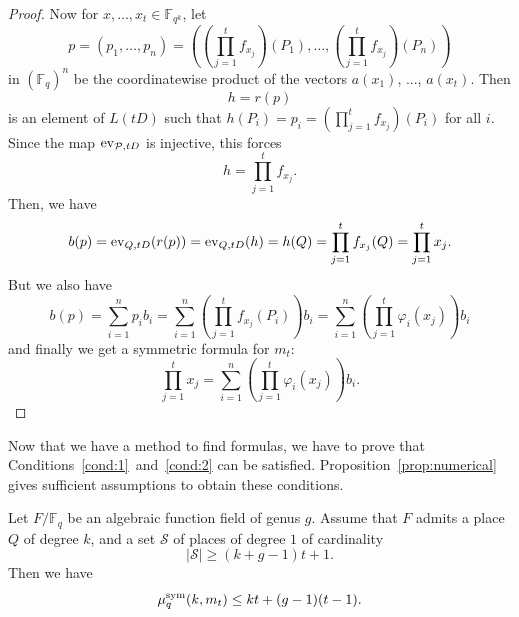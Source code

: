 \begin{proof}
Now for $x,\dots,x_t\in\mathbb{F}_{q^k}$, let
  \[
    p = (p_1,\dots,p_n) = ((\prod_{j=1}^tf_{x_j})(P_1), \dots, (\prod_{j=1}^tf_{x_j})(P_n))
  \]
in $(\mathbb{F}_{q})^n$  be the coordinatewise product of the vectors $a(x_1)$, ..., $a(x_t)$.
Then
\[
  h = r(p)
\]
is an element of $L(tD)$ such that $h(P_i) = p_i = (\prod_{j=1}^tf_{x_j})(P_i)$ for all $i$.
Since the map $\operatorname{ev}_{\mathcal{P}, tD}$ is injective, this forces
\[
  h = \prod_{j=1}^tf_{x_j}.
\]
Then, we have
\begin{equation*}
b(p) = \operatorname{ev}_{Q, tD}(r(p))
  = \operatorname{ev}_{Q, tD}(h)
  = h(Q)
  = \prod_{j=1}^t f_{x_j}(Q)
  = \prod_{j=1}^t x_j.
\end{equation*}
But we also have
\[
  b(p) = \sum_{i=1}^np_ib_i=\sum_{i=1}^n(\prod_{j=1}^tf_{x_j}(P_i))b_i=\sum_{i=1}^n(\prod_{j=1}^t\varphi_i(x_j))b_i
\]
and finally we get a symmetric formula for $m_t$:
\[
  \prod_{j=1}^t x_j = \sum_{i=1}^n(\prod_{j=1}^t\varphi_i(x_j))b_i.
\]
\end{proof}
Now that we have a method to find formulas, we have to prove that
Conditions~\ref{cond:1}~and~\ref{cond:2} can be satisfied.
Proposition~\ref{prop:numerical} gives sufficient assumptions to obtain these
conditions.
\begin{prop}
\label{prop:numerical}
Let $F/\mathbb{F}_{q}$ be an algebraic function field of genus $g$.
Assume that $F$ admits a place $Q$ of degree $k$, and a set $\mathcal{S}$ of places of degree $1$ of cardinality
\[
  |\mathcal{S}|\geq (k+g-1)t+1.
\]
Then we have
\[ \mu^{\textrm{sym}}_q(k,m_t)\leq kt+(g-1)(t-1). \]
\end{prop}
